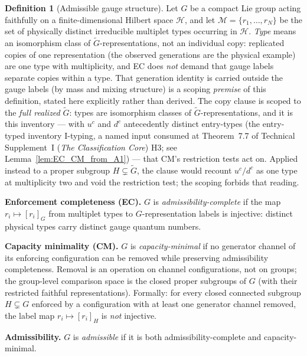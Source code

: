 \documentclass[11pt]{article}
\theoremstyle{definition}
\newtheorem{definition}[theorem]{Definition}
\newcommand{\TSI}{Technical Supplement~I (\emph{The Classification Core})}
\begin{document}
\begin{definition}[Admissible gauge structure]\label{def:admissible_gauge}
Let $G$ be a compact Lie group acting faithfully on a finite-dimensional
Hilbert space $\mathcal{H}$, and let $\mathcal{M} = \{r_1, \ldots, r_N\}$
be the set of physically distinct irreducible multiplet types occurring in
$\mathcal{H}$.  \emph{Type} means an isomorphism class of
$\widetilde{G}$-representations, not an individual copy: replicated
copies of one representation (the observed generations are the
physical example) are one type with multiplicity, and EC does
\emph{not} demand that gauge labels separate copies within a type.
That generation identity is carried outside the gauge labels
(by mass and mixing structure) is a scoping \emph{premise} of this
definition, stated here explicitly rather than derived.  The copy
clause is scoped to the \emph{full realized} $\widetilde{G}$: types
are isomorphism classes of $\widetilde{G}$-representations, and it is
this inventory --- with $u^c$ and $d^c$ antecedently distinct
entry-types (the entry-typed inventory I-typing, a named input
consumed at Theorem~7.7 of \TSI{} H3; see
Lemma~\ref{lem:EC_CM_from_A1}) --- that CM's restriction tests act
on.  Applied instead to a proper subgroup $H \subsetneq \widetilde{G}$,
the clause would recount $u^c/d^c$ as one type at multiplicity two and
void the restriction test; the scoping forbids that reading.

\smallskip\noindent\textbf{Enforcement completeness (EC).}\quad
$G$ is \emph{admissibility-complete} if the map
$r_i \mapsto [r_i]_G$ from multiplet types to $G$-representation labels
is injective: distinct physical types carry distinct gauge quantum numbers.

\smallskip\noindent\textbf{Capacity minimality (CM).}\quad
$G$ is \emph{capacity-minimal} if no generator channel of its
enforcing configuration can be removed while preserving admissibility
completeness.  Removal is an operation on channel configurations, not
on groups; the group-level comparison space is the closed proper
subgroups of $G$ (with their restricted faithful representations).
Formally: for every closed connected subgroup $H \subsetneq G$ enforced
by a configuration with at least one generator channel removed, the
label map $r_i \mapsto [r_i]_H$ is \emph{not} injective.

\smallskip\noindent\textbf{Admissibility.}\quad
$G$ is \emph{admissible} if it is both admissibility-complete and
capacity-minimal.
\end{definition}
\end{document}
